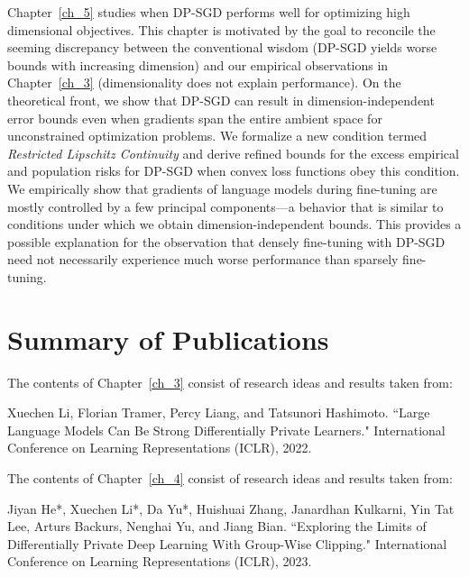 Chapter~\ref{ch_5} studies when DP-SGD performs well for optimizing high dimensional objectives. 
This chapter is motivated by the goal to reconcile the seeming discrepancy between the conventional wisdom (DP-SGD yields worse bounds with increasing dimension) and our empirical observations in Chapter~\ref{ch_3} (dimensionality does not explain performance).
On the theoretical front, we show that DP-SGD can result in dimension-independent error bounds even when gradients span the entire ambient space for unconstrained optimization problems.
We formalize a new condition termed \emph{Restricted Lipschitz Continuity} and derive refined bounds for the excess empirical and population risks for DP-SGD when convex loss functions obey this condition.
We empirically show that gradients of language models during fine-tuning are mostly
controlled by a few principal components---a behavior that is similar to conditions under which we
obtain dimension-independent bounds. 
This provides a possible explanation for the observation that densely fine-tuning with DP-SGD need not necessarily experience much
worse performance than sparsely fine-tuning.

\newpage
\section{Summary of Publications}

\noindent The contents of Chapter~\ref{ch_3} consist of research ideas and results taken from:

\begin{mdframed}[leftline=true, topline=false, rightline=false, bottomline=false, linewidth=2pt]
Xuechen Li, Florian Tramer, Percy Liang, and Tatsunori Hashimoto. ``Large Language Models Can Be Strong Differentially Private Learners." International Conference on Learning Representations (ICLR), 2022.~\cite{li2022large}
\end{mdframed}

\noindent The contents of Chapter~\ref{ch_4} consist of research ideas and results taken from:

\begin{mdframed}[leftline=true, topline=false, rightline=false, bottomline=false, linewidth=2pt]
Jiyan He*, Xuechen Li*, Da Yu*, Huishuai Zhang, Janardhan Kulkarni, Yin Tat Lee, Arturs Backurs, Nenghai Yu, and Jiang Bian. ``Exploring the Limits of Differentially Private Deep Learning With Group-Wise Clipping." International Conference on Learning Representations (ICLR), 2023.~\cite{he2022exploring}
\end{mdframed}

